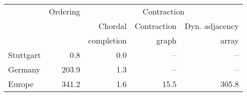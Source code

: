 \begin{tabular}{lrrrr}
\toprule
{} &  Ordering & \multicolumn{3}{c}{Contraction} \\ \cmidrule(lr){3-5}
{} &  {} &  Chordal &  Contraction & Dyn. adjacency \\
{} &  {} &  completion & graph \cite{DibbeltSW16} & array \cite{DibbeltSW16} \\
\midrule
Stuttgart &                          0.8 &                          0.0 &          -- &           -- \\
Germany   &                        203.9 &                          1.3 &          -- &           -- \\
Europe    &                        341.2 &                          1.6 &        15.5 &        305.8 \\
\bottomrule
\end{tabular}

